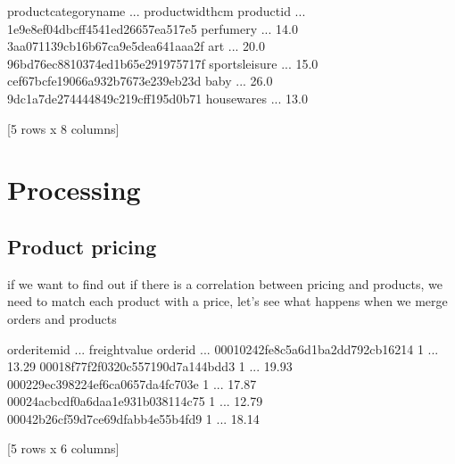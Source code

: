\documentclass[letterpaper,10pt,english]{jupyterBook}
\begin{document}
\begin{sphinxVerbatim}[commandchars=\\\{\}]
                                 product\PYGZus{}category\PYGZus{}name  ...  product\PYGZus{}width\PYGZus{}cm
product\PYGZus{}id                                              ...                  
1e9e8ef04dbcff4541ed26657ea517e5             perfumery  ...              14.0
3aa071139cb16b67ca9e5dea641aaa2f                   art  ...              20.0
96bd76ec8810374ed1b65e291975717f        sports\PYGZus{}leisure  ...              15.0
cef67bcfe19066a932b7673e239eb23d                  baby  ...              26.0
9dc1a7de274444849c219cff195d0b71            housewares  ...              13.0

[5 rows x 8 columns]
\end{sphinxVerbatim}


\section{Processing}
\label{\detokenize{c7_case_studies/Olist:processing}}

\subsection{Product pricing}
\label{\detokenize{c7_case_studies/Olist:product-pricing}}
\sphinxAtStartPar
if we want to find out if there is a correlation between pricing and products, we need to match each product with a price, let’s see what happens when we merge orders and products

\begin{sphinxVerbatim}[commandchars=\\\{\}]
\end{sphinxVerbatim}

\begin{sphinxVerbatim}[commandchars=\\\{\}]
                                  order\PYGZus{}item\PYGZus{}id  ... freight\PYGZus{}value
order\PYGZus{}id                                         ...              
00010242fe8c5a6d1ba2dd792cb16214              1  ...         13.29
00018f77f2f0320c557190d7a144bdd3              1  ...         19.93
000229ec398224ef6ca0657da4fc703e              1  ...         17.87
00024acbcdf0a6daa1e931b038114c75              1  ...         12.79
00042b26cf59d7ce69dfabb4e55b4fd9              1  ...         18.14

[5 rows x 6 columns]
\end{sphinxVerbatim}
\end{document}

